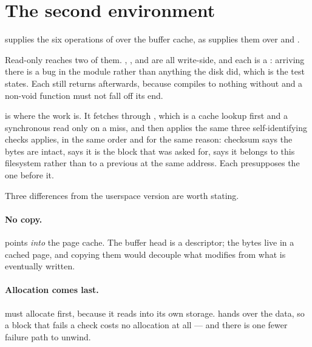 
\section{The second environment}

 supplies the six operations of
 over the buffer cache, as 
supplies them over  and .

Read-only reaches two of them. ,
,  and  are
all write-side, and each is a :  arriving
there is a bug in the module rather than anything the disk did, which is the
test  states. Each still returns afterwards, because
 compiles to nothing without  and a
non-void function must not fall off its end.

 is where the work is. It fetches through
, which is a cache lookup first and a synchronous read only
on a miss, and then applies the same three self-identifying checks
 applies, in the same order and for the same reason: checksum
says the bytes are intact,  says it is the block that was asked
for,  says it belongs to this filesystem rather than to a previous
 at the same address. Each presupposes the one before it.

Three differences from the userspace version are worth stating.

\paragraph{No copy.}  points \emph{into} the page cache. The
buffer head is a descriptor; the bytes live in a cached page, and copying them
would decouple what  modifies from what is eventually written.

\paragraph{Allocation comes last.}  must allocate first,
because it reads into its own storage.  hands over the data,
so a block that fails a check costs no allocation at all --- and there is one
fewer failure path to unwind.

